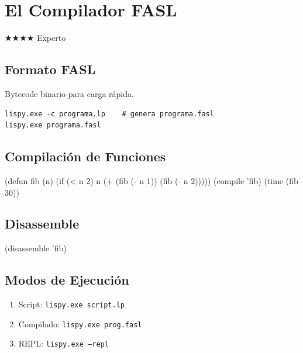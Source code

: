 \chapter{El Compilador FASL}
\label{chap:compiler}
{\huge$\bigstar$}{\huge$\bigstar$}{\huge$\bigstar$}{\huge$\bigstar$} Experto

\section{Formato FASL}
Bytecode binario para carga rápida.

\begin{verbatim}
lispy.exe -c programa.lp    # genera programa.fasl
lispy.exe programa.fasl
\end{verbatim}

\section{Compilación de Funciones}
\begin{lispcode}
(defun fib (n) (if (< n 2) n (+ (fib (- n 1)) (fib (- n 2)))))
(compile 'fib)
(time (fib 30))
\end{lispcode}

\section{Disassemble}
\begin{lispcode}
(disassemble 'fib)
\end{lispcode}

\section{Modos de Ejecución}
\begin{enumerate}
\item Script: \texttt{lispy.exe script.lp}
\item Compilado: \texttt{lispy.exe prog.fasl}
\item REPL: \texttt{lispy.exe --repl}
\end{enumerate}

